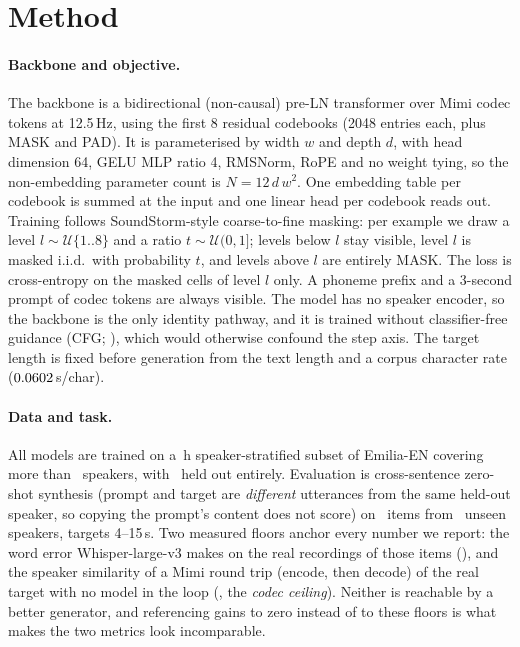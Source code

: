 \documentclass{article}
\newcommand{\dc}[1]{\textcolor{dcol}{#1}}
\newcommand{\wc}[1]{\textcolor{wcol}{#1}}
\begin{document}
\section{Method}
\paragraph{Backbone and objective.}
The backbone is a bidirectional (non-causal) pre-LN transformer over Mimi \citep{moshi}
codec tokens at 12.5\,Hz, using the first 8 residual codebooks (2048 entries each, plus MASK
and PAD). It is parameterised by \wc{width $w$} and \dc{depth $d$}, with head dimension 64,
GELU MLP ratio 4, RMSNorm, RoPE \citep{rmsnorm,rope} and no weight tying, so the non-embedding parameter count is
$N = 12\,d\,w^{2}$. One embedding table per codebook is summed at the input and one linear
head per codebook reads out. Training follows SoundStorm-style \citep{soundstorm}
coarse-to-fine masking: per example we draw a level $l \sim \mathcal{U}\{1..8\}$ and a ratio
$t \sim \mathcal{U}(0,1]$; levels below $l$ stay visible, level $l$ is masked i.i.d.\ with
probability $t$, and levels above $l$ are entirely MASK. The loss is cross-entropy on the
masked cells of level $l$ only. A phoneme prefix and a 3-second prompt of codec tokens are
always visible. The model has no speaker encoder, so the backbone is the only identity
pathway, and it is trained without classifier-free guidance (CFG; \citealp{cfg}), which would otherwise confound
the step axis. The target length is fixed before generation from the text length and a corpus
character rate ($0.0602$\,s/char).

\paragraph{Data and task.}
All models are trained on a \NtrainHours\,h speaker-stratified subset of Emilia-EN
\citep{emilia} covering more than \NtrainSpk\ speakers, with \NheldoutSpk\ held out entirely.
Evaluation is cross-sentence zero-shot synthesis (prompt and target are \emph{different}
utterances from the same held-out speaker, so copying the prompt's content does not score)
on \NevalItems\ items from \NevalSpeakers\ unseen speakers, targets 4--15\,s. Two measured
floors anchor every number we report: the word error Whisper-large-v3 \citep{whisper} makes on the real
recordings of those items (\NwerFloor), and the speaker similarity of a Mimi round trip (encode, then decode) of
the real target with no model in the loop (\NsimCeiling, the \emph{codec ceiling}). Neither is reachable by a better
generator, and referencing gains to zero instead of to these floors is what makes the two
metrics look incomparable.
\end{document}
